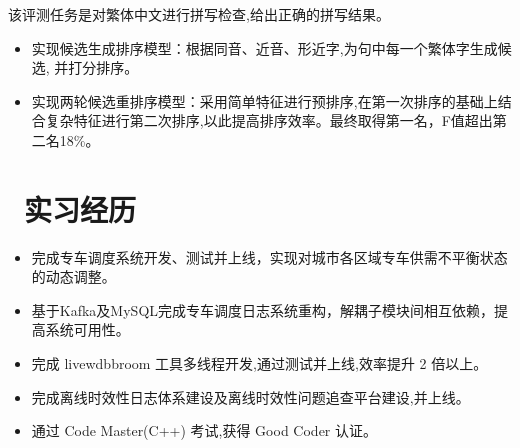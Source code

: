 \documentclass{resume}
\begin{document}
\vspace{-1.5ex}

\begin{onehalfspacing}
该评测任务是对繁体中文进行拼写检查,给出正确的拼写结果。
\begin{itemize}
  \item 实现候选生成排序模型：根据同音、近音、形近字,为句中每一个繁体字生成候选, 并打分排序。
  \item 实现两轮候选重排序模型：采用简单特征进行预排序,在第一次排序的基础上结合复杂特征进行第二次排序,以此提高排序效率。最终取得第一名，F值超出第二名18\%。
\end{itemize}
\end{onehalfspacing}


\vspace{-1ex}

\section{\faSitemap\ 实习经历}
\vspace{-0.5ex}
\begin{onehalfspacing}
\begin{itemize}
  \item 完成专车调度系统开发、测试并上线，实现对城市各区域专车供需不平衡状态的动态调整。
  \item 基于Kafka及MySQL完成专车调度日志系统重构，解耦子模块间相互依赖，提高系统可用性。
\end{itemize}
\end{onehalfspacing}

\vspace{-1.5ex}

\vspace{-0.5ex}
\begin{onehalfspacing}
\begin{itemize}
  \item  完成 livewdbbroom 工具多线程开发,通过测试并上线,效率提升 2 倍以上。
  \item 完成离线时效性日志体系建设及离线时效性问题追查平台建设,并上线。
  \item 通过 Code Master(C++) 考试,获得 Good Coder 认证。
\end{itemize}
\end{onehalfspacing}
\end{document}
